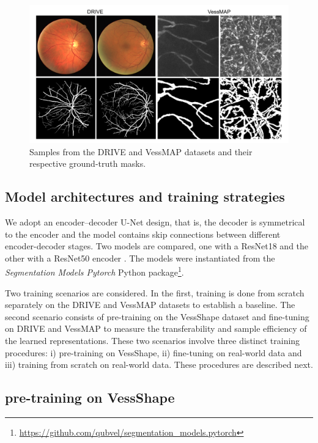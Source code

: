 \documentclass[%
reprint,
nofootinbib,
 amsmath,amssymb,
aps,
superscriptaddress,
showkeys,
longbibliography
]{revtex4-1}
\begin{document}
\begin{figure}[tbp]
    \centering
    \includegraphics[width=\columnwidth]{figures/results/drive_vessmap_samples.pdf}
    \caption{Samples from the DRIVE and VessMAP datasets and their respective ground-truth masks.}
    \label{f:drive_vessmap_samples}
\end{figure}

\subsection{Model architectures and training strategies}

We adopt an encoder–decoder U-Net design, that is, the decoder is symmetrical to the encoder and the model contains skip connections between different encoder-decoder stages. Two models are compared, one with a ResNet18 and the other with a ResNet50 encoder \cite{he2016deep}. The models were instantiated from the \textit{Segmentation Models Pytorch} Python package\footnote{\url{https://github.com/qubvel/segmentation_models.pytorch}}.

Two training scenarios are considered. In the first, training is done from scratch separately on the DRIVE and VessMAP datasets to establish a baseline. The second scenario consists of pre-training on the VessShape dataset and fine-tuning on DRIVE and VessMAP to measure the transferability and sample efficiency of the learned representations. These two scenarios involve three distinct training procedures: i) pre-training on VessShape, ii) fine-tuning on real-world data and iii) training from scratch on real-world data. These procedures are described next.

\subsection{pre-training on VessShape}
\end{document}
